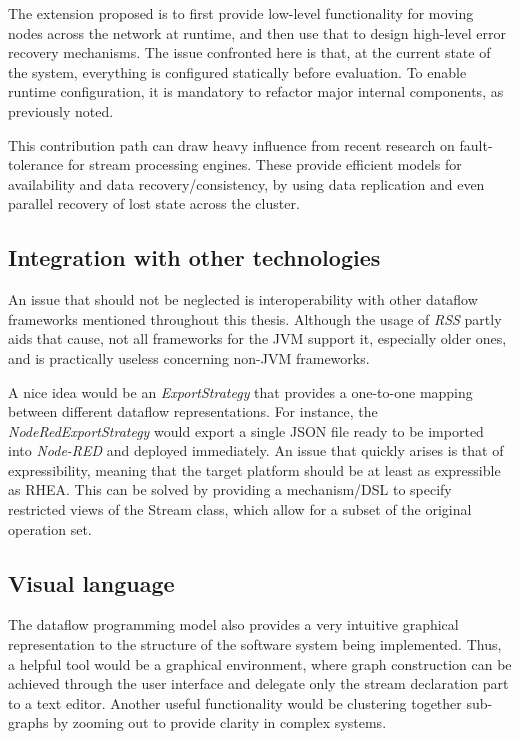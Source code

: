 \documentclass[sigplan,review,anonymous]{acmart}\settopmatter{printfolios=true,printacmref=false}
\begin{document}
The extension proposed is to first provide low-level functionality for moving nodes across the network at runtime, and then use that to design high-level error recovery mechanisms. The issue confronted here is that, at the current state of the system, everything is configured statically before evaluation. To enable runtime configuration, it is mandatory to refactor major internal components, as previously noted.

This contribution path can draw heavy influence from recent research on fault-tolerance for stream processing engines\cite{borealis,dstreams,wide_area}. These provide efficient models for availability and data recovery/consistency, by using data replication and even parallel recovery of lost state across the cluster.

\subsection{Integration with other technologies}

An issue that should not be neglected is interoperability with other dataflow frameworks mentioned throughout this thesis. Although the usage of \textit{RSS} partly aids that cause, not all frameworks for the JVM support it, especially older ones, and is practically useless concerning non-JVM frameworks.

A nice idea would be an \textit{ExportStrategy} that provides a one-to-one mapping between different dataflow representations. For instance, the \textit{NodeRedExportStrategy} would export a single JSON file ready to be imported into \textit{Node-RED} and deployed immediately. An issue that quickly arises is that of expressibility, meaning that the target platform should be at least as expressible as \textsc{RHEA}. This can be solved by providing a mechanism/DSL to specify restricted views of the Stream class, which allow for a subset of the original operation set.

\subsection{Visual language}

The dataflow programming model also provides a very intuitive graphical representation to the structure of the software system being implemented. Thus, a helpful tool would be a graphical environment, where graph construction can be achieved through the user interface and delegate only the stream declaration part to a text editor. Another useful functionality would be clustering together sub-graphs by zooming out to provide clarity in complex systems.
\end{document}
